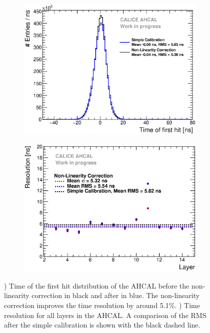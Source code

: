 \begin{figure}[htbp!]
	\begin{subfigure}[t]{0.49\textwidth}
		\centering
		\includegraphics[width=1\textwidth]{../Thesis_Plots/Timing/Muons/Plots/Timing_AHCAL_LinCorrection.eps}
		\caption{}\label{fig:timing_lincorrection}
	\end{subfigure}
	\hfill
	\begin{subfigure}[t]{0.49\textwidth}
		\centering
		\includegraphics[width=1\textwidth]{../Thesis_Plots/Timing/Muons/Plots/ResolutionPerModule_LinCorrection.eps}
		\caption{}\label{fig:reso_lincorrection}
	\end{subfigure}
	\caption{) Time of the first hit distribution of the AHCAL before the non-linearity correction in black and after in blue. The non-linearity correction improves the time resolution by around 5.1\%. ) Time resolution for all layers in the AHCAL. A comparison of the RMS after the simple calibration is shown with the black dashed line.}
\end{figure}

